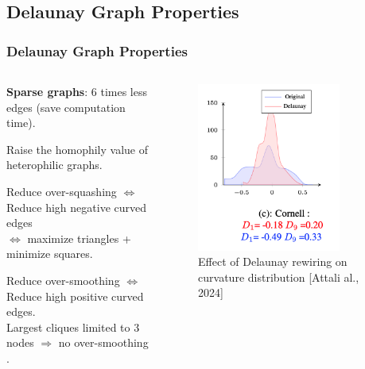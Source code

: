 \documentclass[10pt, aspectratio = 169]{beamer}
\begin{document}
\subsection{Delaunay Graph Properties}
\begin{frame}
    \frametitle{Delaunay Graph Properties}
    \begin{columns}
        \begin{column}{0.6\textwidth}
            \textbf{Sparse graphs}: 6 times less edges (save computation time).

            Raise the homophily value of heterophilic graphs.

            \begin{block}{Reduce over-squashing}
                $\iff$ Reduce high negative curved edges \\$\iff$ maximize triangles + minimize squares.
            \end{block}
            \begin{block}{Reduce over-smoothing}
                $\iff$ Reduce high positive curved edges.\\
                Largest cliques limited to 3 nodes $\Rightarrow$ no over-smoothing \cite[Nguyen et al, 2023]{nguyen2023revisiting}.
            \end{block}
        \end{column}
        \begin{column}{0.4\textwidth}
            \begin{figure}
                \includegraphics[width=0.8\textwidth]{figures/Curvature_delaunay.png}
                \caption{Effect of Delaunay rewiring on curvature distribution [Attali al., 2024] \cite{attali2024delaunay}}
            \end{figure}
        \end{column}
    \end{columns}
\end{frame}
\end{document}
